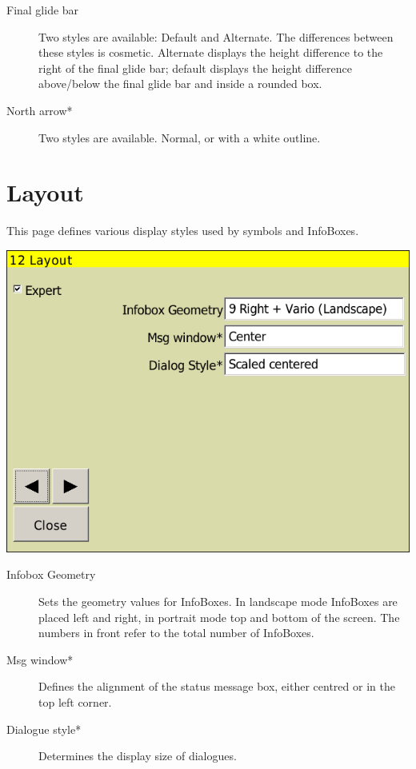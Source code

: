 \begin{description}


\item[Final glide bar]  Two styles are available: Default and
Alternate. The differences between these styles is cosmetic.  Alternate displays the height difference to the 
right of the final glide bar; default displays the height difference above/below the final glide bar and inside a 
rounded box.

\item[North arrow*]  Two styles are available.  Normal, or with a white outline.
\end{description}






\clearpage
\section{Layout}

This page defines various display styles used by symbols and InfoBoxes.

\begin{center}
\includegraphics[angle=0,width=0.8\linewidth,keepaspectratio='true']{figures/config-layout.png}
\end{center}

\begin{description}
\item[Infobox Geometry]  Sets the geometry values for InfoBoxes. In landscape
mode InfoBoxes are placed left and right, in portrait mode top and bottom of the screen. The numbers in front refer 
to the total number of InfoBoxes.
\item[Msg window*]  Defines the alignment of the status message box, either
centred or in the top left corner.
\item[Dialogue style*]  Determines the display size of dialogues.
\end{description}




